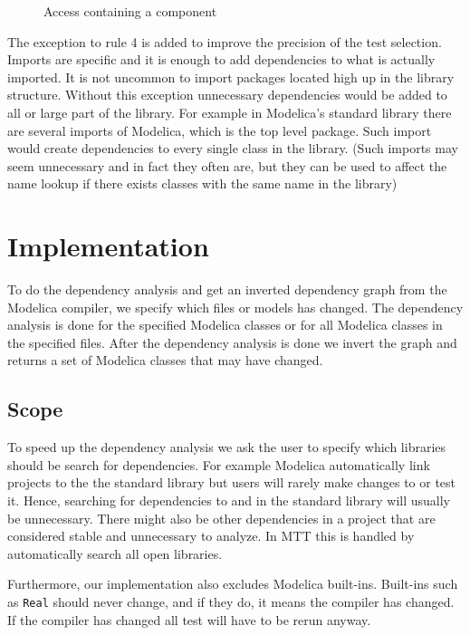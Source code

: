 \documentclass{cslthse-msc}
\begin{document}
\begin{figure}[!htbp]
    \centering
    \qquad
    \subfloat{\raisebox{4.0 cm}{}}
    \caption{Access containing a component}
    \label{fig:brokenAccess}
\end{figure}

The exception to rule 4 is added to improve the precision of the test selection. Imports are specific and it is enough to add dependencies to what is actually imported. It is not uncommon to import packages located high up in the library structure. Without this exception unnecessary dependencies would be added to all or large part of the library. For example in Modelica's standard library there are several imports of Modelica, which is the top level package. Such import would create dependencies to every single class in the library. (Such imports may seem unnecessary and in fact they often are, but they can be used to affect the name lookup if there exists classes with the same name in the library)  

\chapter[Implementation]{Implementation}
To do the dependency analysis and get an inverted dependency graph from the Modelica compiler, we specify which files or models has changed. The dependency analysis is done for the specified Modelica classes or for all Modelica classes in the specified files. After the dependency analysis is done we invert the graph and returns a set of Modelica classes that may have changed.

\section{Scope}
To speed up the dependency analysis we ask the user to specify which libraries should be search for dependencies. For example Modelica automatically link projects to the the standard library but users will rarely make changes to or test it. Hence, searching for dependencies to and in the standard library will usually be unnecessary. There might also be other dependencies in a project that are considered stable and unnecessary to analyze. In MTT this is handled by automatically search all open libraries.

Furthermore, our implementation also excludes Modelica built-ins. Built-ins such as \texttt{Real} should never change, and if they do, it means the compiler has changed. If the compiler has changed all test will have to be rerun anyway.
\end{document}
